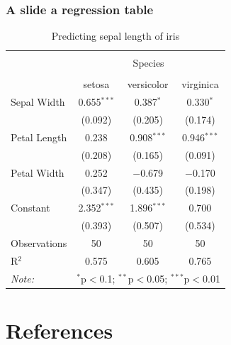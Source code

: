 \documentclass[12pt]{beamer}
\begin{document}
\begin{frame}[fragile]\frametitle{A slide a regression table}

{\scriptsize
\begin{table}[!htbp] \centering 
  \caption{Predicting sepal length of iris}
  \label{} 
\begin{tabular}{@{\extracolsep{5pt}}lccc} 
\toprule
\\[-3ex] & \multicolumn{3}{c}{Species} \\ 
\cline{2-4} 
\\[-1.8ex] & setosa & versicolor & virginica\\ 
\midrule
 Sepal Width & 0.655$^{***}$ & 0.387$^{*}$ & 0.330$^{*}$ \\ 
  & (0.092) & (0.205) & (0.174) \\ 
 Petal Length & 0.238 & 0.908$^{***}$ & 0.946$^{***}$ \\ 
  & (0.208) & (0.165) & (0.091) \\ 
 Petal Width & 0.252 & $-$0.679 & $-$0.170 \\ 
  & (0.347) & (0.435) & (0.198) \\ 
 Constant & 2.352$^{***}$ & 1.896$^{***}$ & 0.700 \\ 
  & (0.393) & (0.507) & (0.534) \\ 
\midrule
Observations & 50 & 50 & 50 \\ 
R$^{2}$ & 0.575 & 0.605 & 0.765 \\ 
\bottomrule
\textit{Note:}  & \multicolumn{3}{r}{$^{*}$p$<$0.1; $^{**}$p$<$0.05; $^{***}$p$<$0.01} \\ 
\end{tabular} 
\end{table} 

}
\end{frame}



\section{References}

\begin{frame}[allowframebreaks] %


\end{frame}
\end{document}
